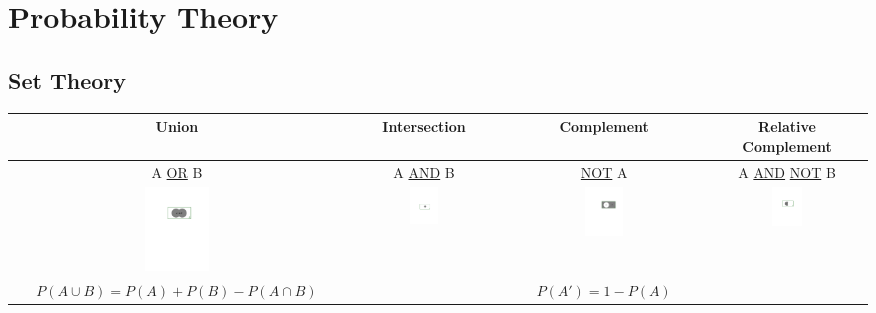 \documentclass{article}
\begin{document}
\section{Probability Theory}
\subsection*{Set Theory}
\begin{table}[H]
    \centering
    \begin{adjustbox}{width=\columnwidth,center}
    \begin{tabular}{c| c| c |c}  
        Union & Intersection & Complement & Relative Complement\\ [0.7ex] \hline \vspace{1ex}
       A \underline{OR} B & A \underline{AND} B & \underline{NOT} A & A \underline{AND} \underline{NOT} B \\
       \includegraphics[width=0.2\textwidth]{./images/AorB.pdf}&\includegraphics[width=0.2\textwidth]{./images/AandB.pdf}&\includegraphics[width=0.2\textwidth]{./images/notA.pdf}&\includegraphics[width=0.2\textwidth]{./images/Aand_notB.pdf}\\
       $P(A\cup B) = P(A)+P(B)-P(A\cap B)$ &&$P(A') = 1 - P(A)$ &
    \end{tabular}
    \end{adjustbox}
\end{table}
\end{document}

